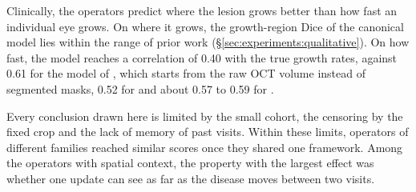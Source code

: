 Clinically, the operators predict where the lesion grows better than how
fast an individual eye grows. On where it grows, the growth-region Dice of
the canonical model lies within the range of prior work
(\S\ref{sec:experiments:qualitative}). On how fast, the model reaches a
correlation of 0.40 with the true growth rates, against 0.61 for the model
of \citet{Mai2024}, which starts from the raw OCT volume instead of
segmented masks, 0.52 for \citet{Gigon2021} and about 0.57 to 0.59 for
\citet{Yoshida2025}.

Every conclusion drawn here is limited by the small cohort, the censoring
by the fixed crop and the lack of memory of past visits. Within these
limits, operators of different families reached similar scores once they
shared one framework. Among the operators with spatial context, the
property with the largest effect was whether one update can see as far as
the disease moves between two visits.



